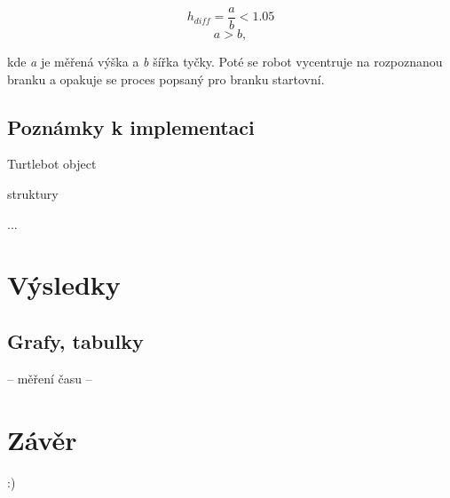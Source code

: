 \documentclass{article}
\begin{document}
	\begin{equation}
		h_{diff} = \frac{a}{b} < 1.05 
	\end{equation}
	\begin{equation}
		a > b,
	\end{equation}
	
	kde {\it a} je měřená výška a {\it b} šířka tyčky. 
	Poté se robot vycentruje na rozpoznanou branku a opakuje se proces popsaný pro branku startovní. 
	
	

\subsection{Poznámky k implementaci}

	Turtlebot object
	
	struktury 
	
	...

\section{Výsledky}
	
	
\subsection{Grafy, tabulky}
	-- měření času --

\newpage
\section{Závěr}
 	:)
\end{document}
